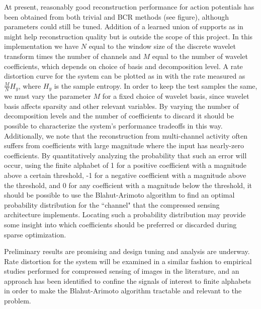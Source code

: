 \documentclass[11pt]{paper}
\begin{document}
At present, reasonably good reconstruction performance for action potentials
has been obtained from both trivial and BCR methods (see figure), although
parameters could still be tuned. Addition of a learned union of supports
as in \cite{charbiwala2011} might help reconstruction quality but is outside
the scope of this project. In this implementation we have $N$ equal to the 
window size of the discrete wavelet transform times the number of channels 
and $M$ equal to the number of wavelet coefficients, which depends on choice
of basis and decomposition level. A rate distortion curve for the system can
be plotted as in \cite{schulz2009} with the rate measured as 
$\frac{M}{N} H_y$, where $H_y$ is the sample entropy. In order to keep the 
test samples the same, we must vary the parameter $M$ for a fixed choice of 
wavelet basis, since wavelet basis affects sparsity and other relevant 
variables. By varying the number of decomposition levels and the number of 
coefficients to discard it should be possible to characterize the system's 
performance tradeoffs in this way. Additionally, we note that the 
reconstruction from multi-channel activity often suffers from coefficients 
with large magnitude where the input has nearly-zero coefficients. By 
quantitatively analyzing the probability that such an error will occur, 
using the finite alphabet of 1 for a positive coefficient with a magnitude 
above a certain threshold, -1 for a negative coefficient with a magnitude 
above the threshold, and 0 for any coefficient with a magnitude below the 
threshold, it should be possible to use the Blahut-Arimoto algorithm 
\cite{yeung2002} to find
an optimal probability distribution for the ``channel" that the compressed 
sensing architecture implements. Locating such a probability distribution 
may provide some insight into which coefficients should be preferred or 
discarded during sparse optimization.

Preliminary results are promising and design tuning and analysis are 
underway. Rate distortion for the system will be examined in a similar 
fashion to empirical studies performed for compressed sensing of images in
the literature, and an approach has been identified to confine the signals
of interest to finite alphabets in order to make the Blahut-Arimoto 
algorithm tractable and relevant to the problem.




\end{document}
